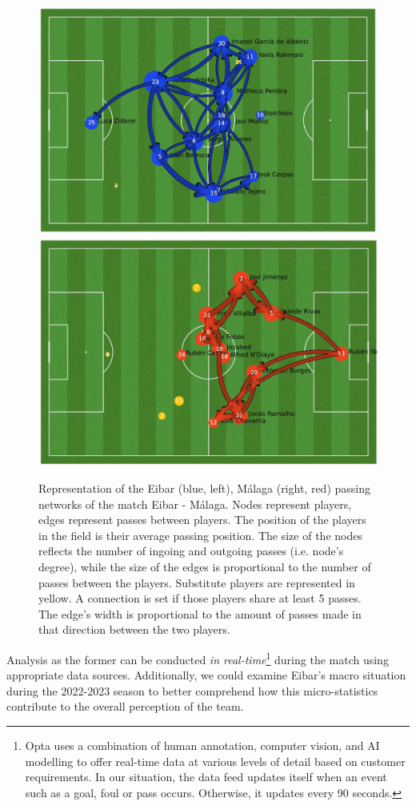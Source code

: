\documentclass[
  10pt,
  twoside,nohyper]{book}
\begin{document}
\begin{figure}[H]

{\centering \includegraphics[width=0.5\linewidth,]{imagenes/home_pass_network} \includegraphics[width=0.5\linewidth,]{imagenes/away_pass_network} 

}

\caption{Representation of the Eibar (blue, left), Málaga (right, red) passing networks of the match Eibar - Málaga. Nodes represent players, edges represent passes between players. The position of the players in the field is their average passing position. The size of the nodes reflects the number of ingoing and outgoing passes (i.e. node’s degree), while the size of the edges is proportional to the number of passes between the players. Substitute players are represented in yellow. A connection is set if those players share at least 5 passes. The edge’s width is proportional to the amount of passes made in that direction between the two players.}\label{fig:homepass}
\end{figure}

Analysis as the former can be conducted \emph{in real-time}\footnote{Opta \autocite{opta} uses a combination of human annotation, computer vision, and AI modelling to offer real-time data at various levels of detail based on customer requirements. In our situation, the data feed updates itself when an event such as a goal, foul or pass occurs. Otherwise, it updates every 90 seconds.} during the
match using appropriate data sources. Additionally, we could examine
Eibar's macro situation during the 2022-2023 season to better comprehend
how this micro-statistics contribute to the overall perception of the
team.
\end{document}
